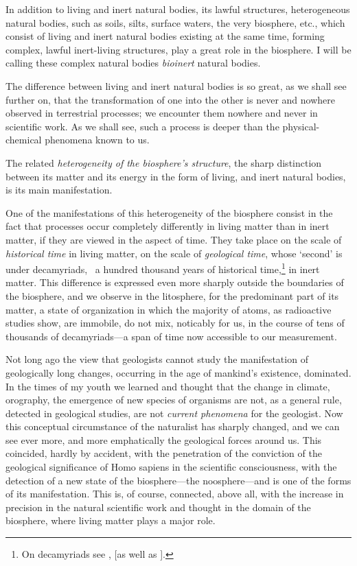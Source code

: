 In addition to living and inert natural bodies, its lawful structures,
heterogeneous natural bodies, such as soils, silts, surface waters, the very
biosphere, etc., which consist of living and inert natural bodies existing at
the same time, forming complex, lawful inert-living
structures, play a great role in the
biosphere.  I will be calling these complex natural bodies \emph{bioinert}
natural bodies.

The difference between living and inert natural bodies is so great, as we shall
see further on, that the transformation of one into the other is never and
nowhere observed in terrestrial processes; we encounter them nowhere and never
in scientific work.  As we shall see, such a process is deeper than the
physical-chemical phenomena known to us.

The related \emph{heterogeneity of the biosphere's structure}, the sharp
distinction between its matter and its energy in the form of living, and inert
natural bodies, is its main manifestation.


\Section %
One of the manifestations of this heterogeneity of the biosphere consist in the
fact that processes occur completely differently in living matter than in inert
matter, if they are viewed in the aspect of time.  They take place on the scale
of \emph{historical time} in living
matter, on the scale of \emph{geological
time}, whose `second' is under
decamyriads, \ie\ a hundred thousand years of historical time,\footnote{
	On decamyriads see \cite{vernadsky1935nekotoryh}, [as well as
	\cite{vernadsky1954sochineniya-nekotorye}].
} in inert matter.  This difference is expressed even more sharply outside the
boundaries of the biosphere, and we observe in the litosphere, for the
predominant part of its matter, a state of organization in which the majority
of atoms, as radioactive studies show, are immobile, do not mix, noticably for
us, in the course of tens of thousands of decamyriads---a span of time now
accessible to our measurement.

Not long ago the view that geologists cannot study the manifestation of
geologically long changes, occurring in the age of mankind's existence,
dominated.  In the times of my youth we learned and thought that the change in
climate, orography, the emergence of new species of organisms are not, as a
general rule, detected in geological studies, are not \emph{current
phenomena} for the geologist.  Now this
conceptual circumstance of the naturalist has sharply changed, and we can see
ever more, and more emphatically the geological forces around us.  This
coincided, hardly by accident, with the penetration of the conviction of the
geological significance of Homo sapiens in the scientific consciousness, with
the detection of a new state of the biosphere---the noosphere---and is one of
the forms of its manifestation.  This is, of course, connected, above all, with
the increase in precision in the natural scientific work and thought in the
domain of the biosphere, where living matter plays a major role.

